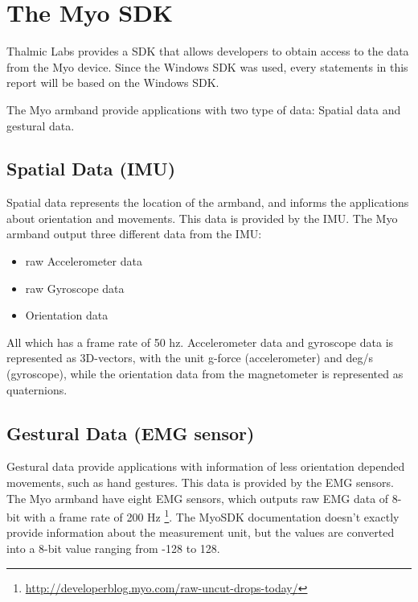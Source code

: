 \section{The Myo SDK}
\label{sec:myoSDK}
Thalmic Labs provides a SDK that allows developers to obtain access to the data from the Myo device. Since the Windows SDK was used, every statements in this report will be based on the Windows SDK.

The Myo armband provide applications with two type of data: Spatial data and gestural data.

\subsection{Spatial Data (IMU)}
Spatial data represents the location of the armband, and informs the applications about orientation and movements. This data is provided by the IMU. The Myo armband output three different data from the IMU: 
\begin{itemize}
  \item raw Accelerometer data
  \item raw Gyroscope data
  \item Orientation data
\end{itemize}
All which has a frame rate of 50 hz. Accelerometer data and gyroscope data is represented as 3D-vectors, with the unit g-force (accelerometer) and deg/s (gyroscope), while the orientation data from the magnetometer is represented as quaternions.

\subsection{Gestural Data (EMG sensor)}
Gestural data provide applications with information of less orientation depended movements, such as hand gestures. This data is provided by the EMG sensors. The Myo armband have eight EMG sensors, which outputs raw EMG data of 8-bit with a frame rate of 200 Hz \footnote{\url{http://developerblog.myo.com/raw-uncut-drops-today/}}. The MyoSDK documentation \cite{myoSDK} doesn't exactly provide information about the measurement unit, but the values are converted into a 8-bit value ranging from -128 to 128.